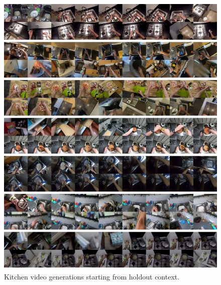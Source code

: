\begin{figure}[h!]
\centering
\includegraphics[width=\linewidth]{figures/kitchens_more/kitchens}
\caption{Kitchen video generations starting from holdout context.}
\label{fig:kitchens_more}
\end{figure}
